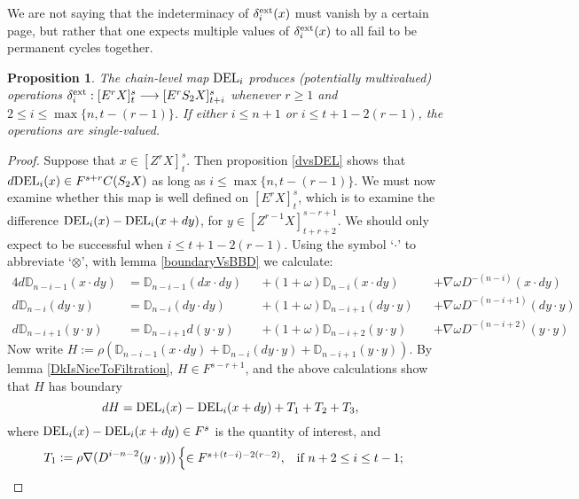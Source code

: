 \documentclass[11pt]{amsart}
\theoremstyle{plain}
\newtheorem{prop}[thm]{Proposition}
\theoremstyle{definition}
\renewcommand{\to}{\longrightarrow}
\theoremstyle{plain}
\newcommand{\twist}{\omega}
\newcommand{\Nabla}{\nabla}
\newcommand{\E}[5]{[E^{#1}_{#2}#3]^{#4}_{#5}}
\newcommand{\EZ}[5]{[Z^{#1}_{#2}#3]^{#4}_{#5}}
\begin{document}
\begin{second quadrant homotopy}
We are not saying that the indeterminacy of $\delta^\textup{ext}_i(x)$ must vanish by a certain page, but rather that one expects multiple values of $\delta^\textup{ext}_i(x)$ to all fail to be permanent cycles together.
\begin{prop}\label{Prop on delta external}
The chain-level map $\textup{DEL}_i$ produces (potentially multivalued) operations $\delta^\textup{ext}_i:\E{r}{}{X}{s}{t}\to \E{r}{}{S_2X}{s}{t+i}$ whenever $r\geq1$ and $2\leq i\leq \max\{n,t-(r-1)\}$. If either $i\leq n+1$ or $i\leq t+1-2(r-1)$, the operations are single-valued.
\end{prop}
\begin{proof}
Suppose that $x\in \EZ{r}{}{X}{s}{t}$. Then proposition \ref{dvsDEL} shows that $d\textup{DEL}_i(x)\in F^{s+r}C(S_2X)$ as long as $i\leq \max\{n,t-(r-1)\}$. We must now examine whether this map is well defined on $\E{r}{}{X}{s}{t}$, which is to examine the difference $\textup{DEL}_i(x)-\textup{DEL}_i(x+dy)$, for $y\in \EZ{r-1}{}{X}{s-r+1}{t+r+2}$. We should only expect to be successful when $i\leq t+1-2(r-1)$.
Using the symbol `$\cdot$' to abbreviate `$\otimes$', with lemma \ref{boundaryVsBBD} we calculate:
\small
\begin{alignat*}{4}
d\mathbb{D}_{n-i-1}(x\cdot dy)&=
{\mathbb{D}_{n-i-1}(dx\cdot dy)}&&+
(1{+}\twist)\mathbb{D}_{n-i}(x\cdot dy)&&+
\Nabla\twist D^{-(n-i)}(x\cdot dy)\\
d\mathbb{D}_{n-i}(dy\cdot y)&=
\mathbb{D}_{n-i}(dy\cdot dy)&&+
(1{+}\twist)\mathbb{D}_{n-i+1}(dy\cdot y)&&+
\Nabla\twist D^{-(n-i+1)}(dy\cdot y)\\
d\mathbb{D}_{n-i+1}(y\cdot y)&=
\mathbb{D}_{n-i+1}d(y\cdot y)&&+
{(1{+}\twist)\mathbb{D}_{n-i+2}(y\cdot y)}&&+
\Nabla\twist D^{-(n-i+2)}(y\cdot y)
\end{alignat*}
\normalsize
Now write $H:=\rho(\mathbb{D}_{n-i-1}(x\cdot dy)+\mathbb{D}_{n-i}(dy\cdot y)+\mathbb{D}_{n-i+1}(y\cdot y))$. By lemma \ref{DkIsNiceToFiltration}, $H\in F^{s-r+1}$, and the above calculations show that $H$ has boundary
\small
\[dH=\textup{DEL}_i(x)-\textup{DEL}_i(x+dy)+T_1+T_2+T_3,\]
\normalsize
where $\textup{DEL}_i(x)-\textup{DEL}_i(x+dy)\in F^s$ is the quantity of interest, and
\begin{align*}
T_1:=\rho\Nabla(D^{i-n-2}(y\cdot y))&\begin{cases}
\in F^{s+(t-i)-2(r-2)},&\textup{if }n+2\leq i\leq t-1;\\

\end{cases}
\end{align*}
\end{proof}
\end{second quadrant homotopy}
\end{document}
